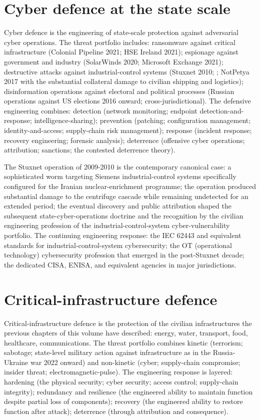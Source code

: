 \section{Cyber defence at the state scale}

Cyber defence is the engineering of state-scale protection against adversarial cyber operations. The threat portfolio includes: ransomware against critical infrastructure (Colonial Pipeline 2021; HSE Ireland 2021); espionage against government and industry (SolarWinds 2020; Microsoft Exchange 2021); destructive attacks against industrial-control systems (Stuxnet 2010; \cite{paper:langner-stuxnet-2013}; NotPetya 2017 with the substantial collateral damage to civilian shipping and logistics); disinformation operations against electoral and political processes (Russian operations against US elections 2016 onward; cross-jurisdictional). The defensive engineering combines: detection (network monitoring; endpoint detection-and-response; intelligence-sharing); prevention (patching; configuration management; identity-and-access; supply-chain risk management); response (incident response; recovery engineering; forensic analysis); deterrence (offensive cyber operations; attribution; sanctions; the contested deterrence theory).

The Stuxnet operation \cite{paper:langner-stuxnet-2013} of 2009-2010 is the contemporary canonical case: a sophisticated worm targeting Siemens industrial-control systems specifically configured for the Iranian nuclear-enrichment programme; the operation produced substantial damage to the centrifuge cascade while remaining undetected for an extended period; the eventual discovery and public attribution shaped the subsequent state-cyber-operations doctrine and the recognition by the civilian engineering profession of the industrial-control-system cyber-vulnerability portfolio. The continuing engineering response: the IEC 62443 and equivalent standards for industrial-control-system cybersecurity; the OT (operational technology) cybersecurity profession that emerged in the post-Stuxnet decade; the dedicated CISA, ENISA, and equivalent agencies in major jurisdictions.

\section{Critical-infrastructure defence}

Critical-infrastructure defence is the protection of the civilian infrastructures the previous chapters of this volume have described: energy, water, transport, food, healthcare, communications. The threat portfolio combines kinetic (terrorism; sabotage; state-level military action against infrastructure as in the Russia-Ukraine war 2022 onward) and non-kinetic (cyber; supply-chain compromise; insider threat; electromagnetic-pulse). The engineering response is layered: hardening (the physical security; cyber security; access control; supply-chain integrity); redundancy and resilience (the engineered ability to maintain function despite partial loss of components); recovery (the engineered ability to restore function after attack); deterrence (through attribution and consequence).

